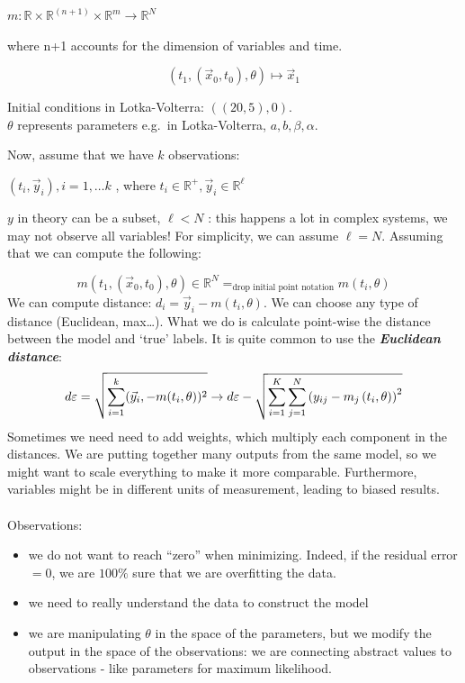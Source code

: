 $m: \mathbb{R} \times \mathbb{R}^{(n+1)} \times \mathbb{R}^m \rightarrow \mathbb{R}^N$

where n+1 accounts for the dimension of variables and time.

$$
\left(t_1,\left(\vec{x}_0, t_0\right), \theta\right)
\longmapsto \vec{x}_1 $$

Initial conditions in Lotka-Volterra: $((20,5), 0)$. 
\\
$\theta$ represents parameters e.g.~in Lotka-Volterra, $a,b,\beta,\alpha$.

Now, assume that we have $k$ observations:

$(t_i ,\vec{y}_i), i=1, \ldots k$ , where
$t_i \in \mathbb{R}^+, \vec{y}_i \in \mathbb{R}^\ell$

$y$ in theory can be a subset, $\ell<N$ : this happens a lot in complex
systems, we may not observe all variables! For simplicity, we can assume
$\ell=N$. Assuming that we can compute the following:

$$m\left(t_1,\left(\vec{x}_0, t_0\right), \theta\right) \in \mathbb{R}^{N} =_{\text{drop initial point notation}} m(t_i,\theta)$$
\noindent
We can compute distance: $d_i=\vec{y}_i-m(t_i, \theta)$.
\noindent
We can choose any type of distance (Euclidean, max\ldots). What we do is
calculate point-wise the distance between the model and `true' labels.
It is quite common to use the \textbf{\emph{Euclidean distance}}:
$$d \varepsilon =\sqrt{\sum_{i=1}^k(\vec{y}_i,-m(t_i, \theta))^2}\\
\rightarrow d{\varepsilon}-\sqrt{\sum_{i=1}^{K} \sum_{j=1}^{N} \left(y_{ij}-m_j\left(t_i, \theta\right)\right)^2}$$
\noindent
Sometimes we need need to add weights, which multiply each component in
the distances. We are putting together many outputs from the same model,
so we might want to scale everything to make it more comparable.
Furthermore, variables might be in different units of measurement,
leading to biased results.
\\
\\
\noindent
Observations:

\begin{itemize}
\tightlist
\item
  we do not want to reach ``zero'' when minimizing. Indeed, if the
  residual error $=0$, we are $100 \%$ sure that we are overfitting the
  data.
\item
  we need to really understand the data to construct the model
\item
  we are manipulating $\theta$ in the space of the parameters, but we
  modify the output in the space of the observations: we are connecting
  abstract values to observations - like parameters for maximum
  likelihood.
\end{itemize}

